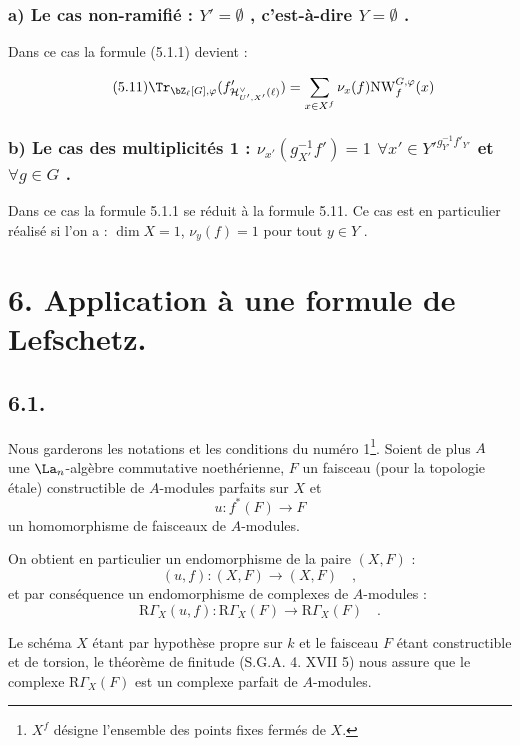\subsubsection*{a) Le cas non-ramifié : $Y' = \emptyset$ , c'est-à-dire $Y = \emptyset$ .}

Dans ce cas la formule (5.1.1) devient :

\begin{equation}\tag{5.11}
\Tr_{\bZ_\ell[G],\varphi}(f'_{\mathcal{H}^\vee_{U',X'}(\ell)}) = \sum_{x \in X^f} \nu_x(f) \mathrm{NW}_f^{G,\varphi}(x)
\end{equation}

\subsubsection*{b) Le cas des multiplicités 1 : $\nu_{x'}(g_{X'}^{-1}f') = 1$ $\forall x'\in {Y'}^{g_{Y'}^{-1}f'_{Y'}}$ et $\forall g\in G$ .}

Dans ce cas la formule 5.1.1 se réduit à la formule 5.11. Ce cas est en particulier réalisé si l'on a : $\dim X = 1$, $\nu_y(f)=1$ pour tout $y\in Y$ .
\section*{6. Application à une formule de Lefschetz.}

\subsection*{6.1.}
Nous garderons les notations et les conditions du numéro 1\footnote{$X^f$ désigne l'ensemble des points fixes fermés de $X$.}. Soient de plus $A$ une $\La_n$-algèbre commutative noethérienne, $F$ un faisceau (pour la topologie étale) constructible de $A$-modules parfaits sur $X$ et
\[
u : f^*(F) \longrightarrow F
\]
un homomorphisme de faisceaux de $A$-modules.

On obtient en particulier un endomorphisme de la paire $(X, F)$ :
\[
(u, f) : (X, F) \longrightarrow (X, F) \quad ,
\]
et par conséquence un endomorphisme de complexes de $A$-modules :
\[
\mathrm{R}\Gamma_X(u, f) : \mathrm{R}\Gamma_X(F) \longrightarrow \mathrm{R}\Gamma_X(F) \quad .
\]

Le schéma $X$ étant par hypothèse propre sur $k$ et le faisceau $F$ étant constructible et de torsion, le théorème de finitude (S.G.A. 4. XVII 5) nous assure que le complexe $\mathrm{R}\Gamma_X(F)$ est un complexe parfait de $A$-modules.

